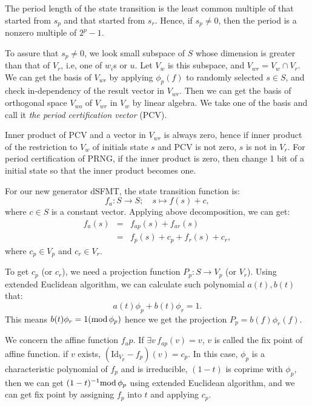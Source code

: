 \documentclass{svmult}
\begin{document}

The period length of the state transition is the least common multiple
of that started from $s_p$ and that started from $s_r$. Hence, 
if $s_p \neq 0$, then the period is a nonzero multiple of $2^p-1$.

To assure that $s_p \neq 0$, we look small subspace of $S$ whose
dimension is greater than that of $V_r$, i.e, one of $w_i$s or $u$.
Let $V_w$ is this subspace, and $V_{wr} = V_w \cap V_r$.  We can get
the basis of $V_{wr}$ by applying $\phi_p(f)$ to randomly selected $s
\in S$, and check in-dependency of the result vector in $V_{wr}$. Then
we can get the basis of orthogonal space $V_{wo}$ of $V_{wr}$ in $V_w$
by linear algebra. We take one of the basis and call it {\em the
  period certification vector} (PCV).

Inner product of PCV and a vector in $V_{wr}$ is always zero,
hence if inner product of the restriction to $V_w$ of initials state $s$
and PCV is not zero, $s$ is not in $V_r$. For period certification of
PRNG, if the inner product is zero, then change 1 bit of a initial state
so that the inner product becomes one.

For our new generator dSFMT, the state transition function is:
\[
  f_a: S \to S ; \quad s \mapsto f(s) + c,
\]
where $c \in S$ is a constant vector.  Applying above decomposition,
we can get:
\begin{eqnarray*}
  f_a(s) &=& f_{ap}(s) + f_{ar}(s) \\
  &=&f_p(s) + c_p + f_r(s) + c_r,
\end{eqnarray*}
where $c_p \in V_p$ and $c_r \in V_r$.

To get $c_p$ (or $c_r$), we need a projection function $P_p: S \to
V_p$ (or $V_r$). Using extended Euclidean algorithm, we can
calculate such polynomial $a(t), b(t)$ that:
\[
a(t)\phi_p + b(t)\phi_r = 1.
\]
This means $b(t)\phi_r = 1 (\textrm{mod}\, \phi_p)$ hence we get the projection
$P_p = b(f)\phi_r(f).$

We concern the affine function $f_ap$. If $\exists v\, f_{ap}(v) = v$,
$v$ is called the fix point of affine function. if $v$ exists, 
$(\textrm{Id}_{V_p} - f_p)(v) = c_p$. In this case,
$\phi_p$ is a characteristic polynomial of $f_p$ and is irreducible,
$(1 - t)$ is coprime with $\phi_p$, then we can get $(1 - t)^{-1} \textrm{mod}\, 
\phi_p$ using extended Euclidean algorithm, and we can get fix point
by assigning $f_p$ into $t$ and applying $c_p.$
\end{document}
